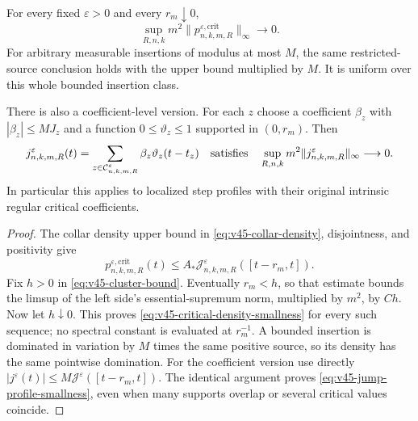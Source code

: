 \begin{theorem}
\label{thm:v45-critical-source-smallness}
For every fixed $\varepsilon>0$ and every $r_m\downarrow0$,
\begin{equation}\label{eq:v45-critical-density-smallness}
 \sup_{R,n,k}m^2\|p^{\varepsilon,\mathrm{crit}}_{n,k,m,R}\|_\infty
                                        \longrightarrow0.
\end{equation}
For arbitrary measurable insertions of modulus at most $M$, the same
restricted-source conclusion holds with the upper bound multiplied
by $M$. It is uniform over this whole bounded insertion class.

There is also a coefficient-level version. For each $z$ choose a
coefficient $\beta_z$ with $|\beta_z|\le M J_z$ and a function
$0\le\vartheta_z\le1$ supported in $(0,r_m)$. Then
\begin{equation}\label{eq:v45-jump-profile-smallness}
 j^\varepsilon_{n,k,m,R}(t)
       =\sum_{z\in\mathcal C^\varepsilon_{n,k,m,R}}
                       \beta_z\vartheta_z(t-t_z)
 \quad\hbox{satisfies}\quad
 \sup_{R,n,k}m^2\|j^\varepsilon_{n,k,m,R}\|_\infty\longrightarrow0.
\end{equation}
In particular this applies to localized step profiles with their
original intrinsic regular critical coefficients.
\end{theorem}
\begin{proof}
The collar density upper bound in
\eqref{eq:v45-collar-density}, disjointness, and positivity give
\begin{equation}\label{eq:v45-critical-density-cluster}
 p^{\varepsilon,\mathrm{crit}}_{n,k,m,R}(t)
       \le A_*
              \mathcal J^\varepsilon_{n,k,m,R}([t-r_m,t]).
\end{equation}
Fix $h>0$ in \eqref{eq:v45-cluster-bound}. Eventually $r_m<h$, so
that estimate bounds the limsup of the left side's essential-supremum
norm, multiplied by $m^2$, by $C h$.
Now let $h\downarrow0$. This proves
\eqref{eq:v45-critical-density-smallness} for every such sequence;
no spectral constant is evaluated at $r_m^{-1}$.
A bounded insertion is dominated in variation by $M$ times the same
positive source, so its density has the same pointwise domination.
For the coefficient version use directly
$|j^\varepsilon(t)|\le M\mathcal J^\varepsilon([t-r_m,t])$.
The identical argument proves \eqref{eq:v45-jump-profile-smallness},
even when many supports overlap or several critical values coincide.
\end{proof}

